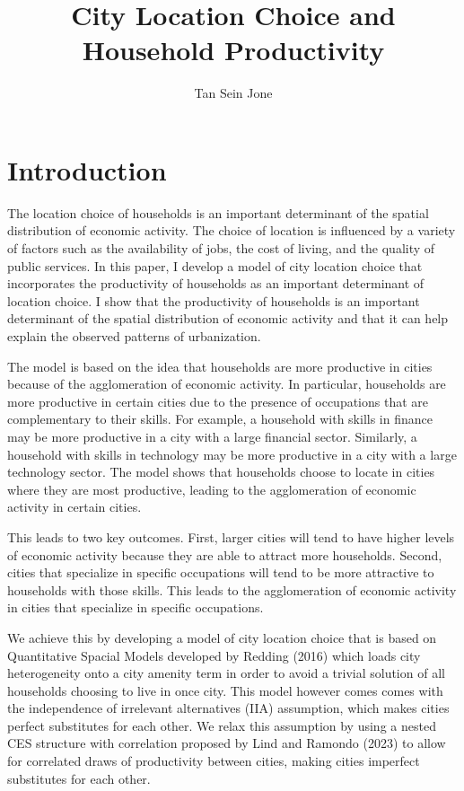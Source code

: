 \documentclass[10pt]{article}
\title{City Location Choice and Household Productivity}
\author{Tan Sein Jone}
\date{}
\begin{document}
\doublespacing
\maketitle

\section{Introduction}

The location choice of households is an important determinant of the spatial distribution of economic activity. The choice of location is influenced by a variety of factors such as the availability of jobs, the cost of living, and the quality of public services. In this paper, I develop a model of city location choice that incorporates the productivity of households as an important determinant of location choice. I show that the productivity of households is an important determinant of the spatial distribution of economic activity and that it can help explain the observed patterns of urbanization.

The model is based on the idea that households are more productive in cities because of the agglomeration of economic activity. In particular, households are more productive in certain cities due to the presence of occupations that are complementary to their skills. For example, a household with skills in finance may be more productive in a city with a large financial sector. Similarly, a household with skills in technology may be more productive in a city with a large technology sector. The model shows that households choose to locate in cities where they are most productive, leading to the agglomeration of economic activity in certain cities.

This leads to two key outcomes. First, larger cities will tend to have higher levels of economic activity because they are able to attract more households. Second, cities that specialize in specific occupations will tend to be more attractive to households with those skills. This leads to the agglomeration of economic activity in cities that specialize in specific occupations.

We achieve this by developing a model of city location choice that is based on Quantitative Spacial Models developed by Redding (2016) which loads city heterogeneity onto a city amenity term in order to avoid a trivial solution of all households choosing to live in once city. This model however comes comes with the independence of irrelevant alternatives (IIA) assumption, which makes cities perfect substitutes for each other. We relax this assumption by using a nested CES structure with correlation proposed by Lind and Ramondo (2023) to allow for correlated draws of productivity between cities, making cities imperfect substitutes for each other.
\end{document}
